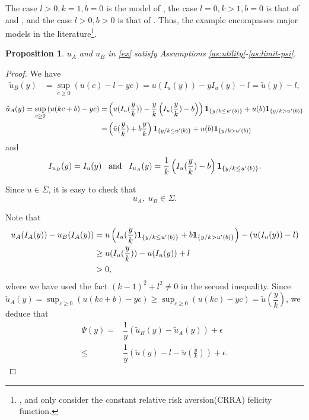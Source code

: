 \documentclass[a4paper,report, 11pt]{article}
\newtheorem{pro}{Proposition}[section]
\def\e{\epsilon}
\begin{document}
The case $l>0, k=1, b=0$ is the model of \citet{CS2006}, the case $l=0, k>1, b=0$ is that of \citet{FP2007} and \citet{DL2010}, and the case $l>0, b>0$ is that of  \citet{BJKP2020}. Thus, the example encompasses major models in the literature\footnote{{\citet{FP2007}, \citet{DL2010} and \citet{BJKP2020} only consider the constant relative risk aversion(CRRA) felicity function.}}.
{
\begin{pro}\label{pro:assumption}
	$u_A$ and $u_B$ in \eqref{ex} satisfy Assumptions \ref{as:utility}-\ref{as:limit-psi}. 
\end{pro}
\begin{proof}
	We have
	\begin{align*}
	\tilde{u}_B(y)&=\sup_{c\ge 0}\left(u(c)-l-yc\right)=u(I_u(y))-yI_u(y)-l=\tilde{u}(y)-l,
	\end{align*}
	\begin{align*}
	\tilde{u}_A(y)=\sup_{c\ge 0}\left(u(kc+b)-yc\right)=&\left(u(I_u(\dfrac{y}{k}))-\dfrac{y}{k}\left(I_u(\dfrac{y}{k})-b\right)\right){\bf 1}_{\{y/k\le u'(b) \}} +u(b){\bf 1}_{\{y/k>u'(b)\}}\\
	=&\left(\tilde{u}(\dfrac{y}{k})+b\dfrac{y}{k}\right){\bf 1}_{\{y/k\le u'(b) \}} +u(b){\bf 1}_{\{y/k>u'(b)\}}
	\end{align*}
	and 
	\begin{align}
	I_{u_B}(y)=I_u(y)\;\;\;\mbox{and}\;\;\;I_{u_A}(y)=\dfrac{1}{k}\left(I_u(\dfrac{y}{k})-b\right){\bf 1}_{\{y/k\le u'(b) \}}.
	\end{align}
	
	Since $u\in \Sigma$, it is easy to check that 
	\begin{equation}\label{eq:assumption1}
	u_A,\;u_B \in \Sigma. 
	\end{equation}
	
	Note that 
	\begin{align}\label{eq:assumption2}
	u_A(I_A(y))-u_B(I_A(y))=&\;u\left(I_u(\dfrac{y}{k}){\bf 1}_{\{y/k\le u'(b) \}}+b{\bf 1}_{\{y/k> u'(b) \}}\right)-\left(u(I_u(y))-l\right)\nonumber\\
	\ge&\;u(I_u(\dfrac{y}{k}))-u(I_u(y))+l\\
	>&\;0, \nonumber
	\end{align}
	where we have used the fact $(k-1)^2+l^2 \ne 0$ in the second inequality.
	\medskip
	Since $\tilde{u}_A(y)=\sup_{c\ge 0}\left(u(kc+b)-yc\right)\ge \sup_{c\ge 0}\left(u(kc)-yc\right)=\tilde{u}(\dfrac{y}{k})$, 
	we deduce that 
	\begin{align}
	\Psi(y)=&\dfrac{1}{y}\left(\tilde{u}_B(y)-\tilde{u}_A(y)\right)+\e\\
	\le&\dfrac{1}{y}\left(\tilde{u}(y)-l - \tilde{u}(\frac{y}{k})\right)+\e. \nonumber
	\end{align}
	

\end{proof}}
\end{document}

